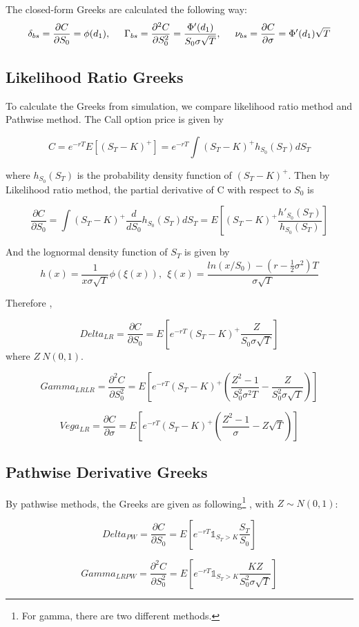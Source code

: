 \documentclass[11pt,a4paper,fleqn]{article}
\begin{document}
The closed-form Greeks are calculated the following way:
$$\delta_{bs} = \frac{\partial C}{\partial S_0}=\phi(d_1),\hspace*{.5cm} \Gamma_{bs} = \frac{\partial^2 C}{\partial S_0^2}=\frac{\Phi'(d_1)}{S_0\sigma \sqrt{T}},\hspace*{.5cm} \nu_{bs} =  \frac{\partial C}{\partial \sigma}=\Phi'(d_1)\sqrt{T}$$

\subsection{Likelihood Ratio Greeks}
To calculate the Greeks from simulation, we compare likelihood ratio method and Pathwise method. The Call option price is given by

$$C = e^{-rT}E[(S_T-K)^+]=e^{-rT}\int(S_T-K)^+ h_{S_0}(S_T) dS_T$$

where $ h_{S_0}(S_T)$ is the probability density function of $(S_T-K)^+$. Then by Likelihood ratio method, the partial derivative of C with respect to $S_0$ is

$$\frac{\partial C}{\partial S_0}=\int(S_T-K)^+\frac{d}{dS_0}h_{S_0}(S_T) dS_T=E[(S_T-K)^+\frac{h'_{S_0}(S_T)}{h_{S_0}(S_T)}] $$

And the lognormal density function of $S_T$ is given by
$$h(x)=\frac{1}{x\sigma \sqrt{T}}\phi(\xi(x)), \ \ \xi(x)=\frac{ln(x/S_0)-(r-\frac{1}{2}\sigma^2)T}{\sigma \sqrt{T}}  $$

Therefore \cite{lectures},

$$Delta_{LR}=\frac{\partial C}{\partial S_0}=E[e^{-rT}(S_T-K)^+\frac{Z}{S_0\sigma\sqrt{T}}]$$
where $Z~N(0,1).$

$$Gamma_{LR LR} = \frac{\partial^2 C}{\partial  S_0^2 }=E[e^{-rT}(S_T-K)^+(\frac{Z^2-1}{S_0^2\sigma^2 T } - \frac{Z}{S_0^2 \sigma \sqrt{T}})]$$

$$Vega_{LR} = \frac{\partial C}{\partial \sigma}=E[e^{-rT}(S_T-K)^+\left(\frac{Z^2-1}{\sigma}-Z\sqrt{T}\right)]$$

\subsection{Pathwise Derivative Greeks}
By pathwise methods, the Greeks are given as following\footnote{For gamma, there are two different methods.} \cite{lectures}, with $Z\sim N(0,1)$:

$$Delta_{PW}=\frac{\partial C}{\partial S_0}=E[e^{-rT}\mathds{1}_{S_T>K}\frac{S_T}{S_0}]$$

$$Gamma_{LRPW} = \frac{\partial^2 C}{\partial  S_0^2 }=E[e^{-rT}\mathds{1}_{S_T>K}\frac{KZ}{S_0^2\sigma\sqrt{T}}]$$
\end{document}
